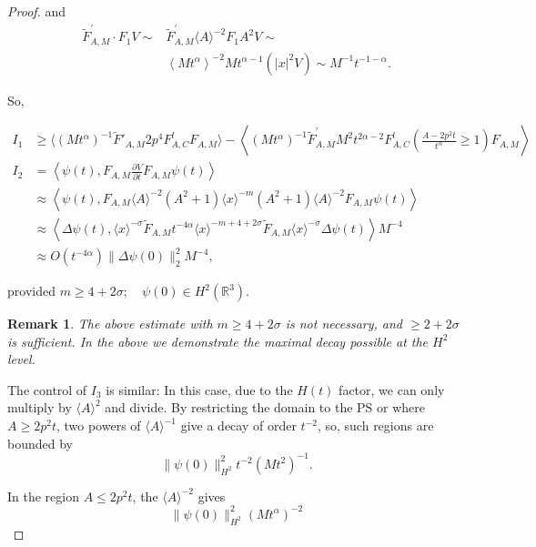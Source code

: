 \documentclass[11pt]{article}
\newtheorem{remark}[theorem]{Remark}
\begin{document}
\begin{proof}
and
$$
\begin{aligned}
\tilde{F}_{A, M}^{\prime} \cdot F_{1} V \sim & \tilde{F}_{A, M}^{\prime}\langle A\rangle^{-2} F_{1} A^{2} V \sim \\
& \left\langle M t^{\alpha}\right\rangle^{-2} M t^{\alpha-1}\left( |x|^{2} V\right) \sim M^{-1} t^{-1-\alpha}.
\end{aligned}
$$

So,

\begin{align*}
I_{1} &\geqslant\langle (Mt^{\alpha})^{-1}\tilde F'_{A,M}2p^4 F_{A,C}^lF_{A,M}\rangle-\left\langle\left(M t^{\alpha}\right)^{-1} \tilde F_{A, M}^{'} M^{2} t^{2 \alpha-2} F_{A, C}^l\left(\frac{A-2 p^{2} t}{t^{\alpha}} \geqslant 1\right) F_{A, M}\right\rangle \\
I_{2} & =\left\langle\psi(t), F_{A, M} \frac{\partial V}{\partial t} F_{A, M} \psi(t)\right\rangle  \tag{C.7}\\
& \approx\left\langle\psi(t), F_{A, M}\langle A\rangle^{-2}\left(A^{2}+1\right)\langle x\rangle^{-m}\left(A^{2}+1\right)\langle A\rangle^{-2} F_{A, M} \psi(t)\right\rangle  \tag{C.8}\\
& \approx\left\langle\Delta \psi(t),\langle x\rangle^{-\sigma} \tilde{F}_{A,M} t^{-4 \alpha}\langle x\rangle^{-m+4+2 \sigma} \tilde{F}_{A, M}\langle x\rangle^{-\sigma} \Delta \psi(t)\right\rangle M^{-4} \\
& \approx O\left(t^{-4 \alpha}\right)\|\Delta \psi(0)\|_{2}^{2} M^{-4},
\end{align*}

provided $m \geqslant 4+2 \sigma ; \quad \psi(0) \in H^{2}\left(\mathbb{R}^{3}\right)$.
\begin{remark}
The above estimate with $m\geqslant 4+2 \sigma$ is not necessary, and $\geqslant 2+2 \sigma$ is sufficient.
In the above we demonstrate the maximal decay possible at the $H^2$ level.
\end{remark}

The control of  $I_3$ is similar:
In this case, due to the $H(t)$ factor, we can only multiply by $\langle A\rangle^{2}$ and divide.
By restricting the domain to the PS or where
$A \geqslant 2 p^{2} t$, two powers of $\langle A\rangle ^{-1}$ give a decay of order $t^{-2}$, so, such regions are bounded by
$$
\|\psi(0)\|_{H^{2}}^{2} t^{-2}\left(M t^{2}\right)^{-1} .
$$

In the region $A \leq 2 p^{2} t$, the $\langle A\rangle^{-2}$ gives
$$
\|\psi(0)\|_{H^{2}}^{2}\left(M t^{\alpha}\right)^{-2}
$$


\end{proof}
\end{document}
